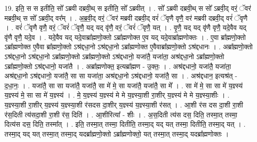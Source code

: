 \documentclass[17pt]{extarticle}
\begin{document}
19. इति॒ स स इतीति॒ सो᳚ ऽब्रवी दब्रवी॒थ् स इतीति॒ सो᳚ ऽब्रवीत् । . सो᳚ ऽब्रवी दब्रवी॒थ् स सो᳚ ऽब्रवी॒द् वरं॒ ॅवर॑ मब्रवी॒थ् स सो᳚ ऽब्रवी॒द् वर᳚म् । . अ॒ब्र॒वी॒द् वरं॒ ॅवर॑ मब्रवी दब्रवी॒द् वरं॑ ॅवृणै वृणै॒ वर॑ मब्रवी दब्रवी॒द् वरं॑ ॅवृणै । . वरं॑ ॅवृणै वृणै॒ वरं॒ ॅवरं॑ ॅवृणै॒ यद् यद् वृ॑णै॒ वरं॒ ॅवरं॑ ॅवृणै॒ यत् । . वृ॒णै॒ यद् यद् वृ॑णै वृणै॒ यदे॒वैव यद् वृ॑णै वृणै॒ यदे॒व । . यदे॒वैव यद् यदे॒वाब्रा᳚ह्मणो॒क्तो ऽब्रा᳚ह्मणोक्त ए॒व यद् यदे॒वाब्रा᳚ह्मणोक्तः । . ए॒वा ब्रा᳚ह्मणो॒क्तो ऽब्रा᳚ह्मणोक्त ए॒वैवा ब्रा᳚ह्मणो॒क्तो ऽश्र॑द्दधा॒नो ऽश्र॑द्दधा॒नो ऽब्रा᳚ह्मणोक्त ए॒वैवाब्रा᳚ह्मणो॒क्तो ऽश्र॑द्दधानः । . अब्रा᳚ह्मणो॒क्तो ऽश्र॑द्दधा॒नो ऽश्र॑द्दधा॒नो ऽब्रा᳚ह्मणो॒क्तो ऽब्रा᳚ह्मणो॒क्तो ऽश्र॑द्दधानो॒ यजा॑तै॒ यजा॑ता॒ अश्र॑द्दधा॒नो ऽब्रा᳚ह्मणो॒क्तो ऽब्रा᳚ह्मणो॒क्तो ऽश्र॑द्दधानो॒ यजा॑तै । . अब्रा᳚ह्मणोक्त॒ इत्यब्रा᳚ह्मण - उ॒क्तः॒ । . अश्र॑द्दधानो॒ यजा॑तै॒ यजा॑ता॒ अश्र॑द्दधा॒नो ऽश्र॑द्दधानो॒ यजा॑तै॒ सा सा यजा॑ता॒ अश्र॑द्दधा॒नो ऽश्र॑द्दधानो॒ यजा॑तै॒ सा । . अश्र॑द्दधान॒ इत्यश्र॑त् - द॒धा॒नः॒ । . यजा॑तै॒ सा सा यजा॑तै॒ यजा॑तै॒ सा मे॑ मे॒ सा यजा॑तै॒ यजा॑तै॒ सा मे᳚ । . सा मे॑ मे॒ सा सा मे॑ य॒ज्ञ्स्य॑ य॒ज्ञ्स्य॑ मे॒ सा सा मे॑ य॒ज्ञ्स्य॑ । . मे॒ य॒ज्ञ्स्य॑ य॒ज्ञ्स्य॑ मे मे य॒ज्ञ्स्या॒शी रा॒शीर् य॒ज्ञ्स्य॑ मे मे य॒ज्ञ्स्या॒शीः । . य॒ज्ञ्स्या॒शी रा॒शीर् य॒ज्ञ्स्य॑ य॒ज्ञ्स्या॒शी र॑सदस दा॒शीर् य॒ज्ञ्स्य॑ य॒ज्ञ्स्या॒शी र॑सत् । . आ॒शी र॑स दस दा॒शी रा॒शी र॑स॒दिती त्य॑सदा॒शी रा॒शी र॑स॒ दिति॑ । . आ॒शीरित्या᳚ - शीः । . अ॒स॒दिती त्य॑स दस॒ दिति॒ तस्मा॒त् तस्मा॒ दित्य॑स दस॒ दिति॒ तस्मा᳚त् । . इति॒ तस्मा॒त् तस्मा॒ दितीति॒ तस्मा॒द् यद् यत् तस्मा॒ दितीति॒ तस्मा॒द् यत् । . तस्मा॒द् यद् यत् तस्मा॒त् तस्मा॒द् यदब्रा᳚ह्मणो॒क्तो ऽब्रा᳚ह्मणोक्तो॒ यत् तस्मा॒त् तस्मा॒द् यदब्रा᳚ह्मणोक्तः । \newline
\end{document}
